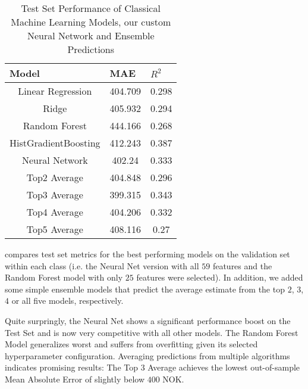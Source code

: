 \begin{table}[t]
  \centering
  \begin{tabular}{@{}ccc@{}}
    \toprule
    \multicolumn{1}{l}{Model} & \multicolumn{1}{l}{MAE} & \multicolumn{1}{l}{\textbf{$R^2$}} \\ \midrule
    Linear Regression         & 404.709                 & 0.298                              \\
    Ridge                     & 405.932                 & 0.294                              \\
    Random Forest             & 444.166                 & 0.268                              \\
    HistGradientBoosting      & 412.243                 & 0.387                              \\
    Neural Network            & 402.24                  & 0.333                              \\
    Top2 Average              & 404.848                 & 0.296                              \\
    Top3 Average              & 399.315                 & 0.343                              \\
    Top4 Average              & 404.206                 & 0.332                              \\
    Top5 Average              & 408.116                 & 0.27                               \\ \bottomrule
  \end{tabular}
  \caption{Test Set Performance of Classical Machine Learning Models, our custom Neural Network and Ensemble Predictions}
  \label{tab:test-set}
\end{table}

 compares test set metrics for the best performing models on the validation set within each class (i.e. the Neural Net version with all $59$ features and the Random Forest model with only $25$ features were selected).
In addition, we added some simple ensemble models that predict the average estimate from the top $2$, $3$, $4$ or all five models, respectively.

Quite surpringly, the Neural Net shows a significant performance boost on the Test Set and is now very competitive with all other models.
The Random Forest Model generalizes worst and suffers from overfitting given its selected hyperparameter configuration.
Averaging predictions from multiple algorithms indicates promising results:
The Top $3$ Average achieves the lowest out-of-sample Mean Absolute Error of slightly below $400$ NOK.





